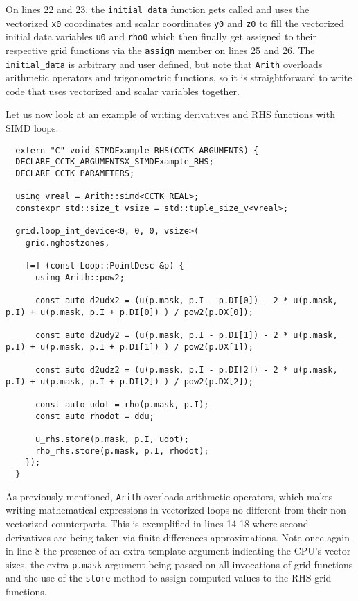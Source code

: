 On lines 22 and 23, the \texttt{initial\_data} function gets called and uses the vectorized \texttt{x0} coordinates and scalar coordinates \texttt{y0} and \texttt{z0} to fill the vectorized initial data variables \texttt{u0} and \texttt{rho0} which then finally get assigned to their respective grid functions via the \texttt{assign} member on lines 25 and 26. The \texttt{initial\_data} is arbitrary and user defined, but note that \texttt{Arith} overloads arithmetic operators and trigonometric functions, so it is straightforward to write code that uses vectorized and scalar variables together. 

Let us now look at an example of writing derivatives and RHS functions with SIMD loops.

\begin{lstlisting}
  extern "C" void SIMDExample_RHS(CCTK_ARGUMENTS) {
  DECLARE_CCTK_ARGUMENTSX_SIMDExample_RHS;
  DECLARE_CCTK_PARAMETERS;

  using vreal = Arith::simd<CCTK_REAL>;
  constexpr std::size_t vsize = std::tuple_size_v<vreal>;

  grid.loop_int_device<0, 0, 0, vsize>(
    grid.nghostzones,
    
    [=] (const Loop::PointDesc &p) {
      using Arith::pow2;

      const auto d2udx2 = (u(p.mask, p.I - p.DI[0]) - 2 * u(p.mask, p.I) + u(p.mask, p.I + p.DI[0]) ) / pow2(p.DX[0]);
      
      const auto d2udy2 = (u(p.mask, p.I - p.DI[1]) - 2 * u(p.mask, p.I) + u(p.mask, p.I + p.DI[1]) ) / pow2(p.DX[1]);
      
      const auto d2udz2 = (u(p.mask, p.I - p.DI[2]) - 2 * u(p.mask, p.I) + u(p.mask, p.I + p.DI[2]) ) / pow2(p.DX[2]);

      const auto udot = rho(p.mask, p.I);
      const auto rhodot = ddu;

      u_rhs.store(p.mask, p.I, udot);
      rho_rhs.store(p.mask, p.I, rhodot);
    });
  }
\end{lstlisting}

As previously mentioned, \texttt{Arith} overloads arithmetic operators, which makes writing mathematical expressions in vectorized loops no different from their non-vectorized counterparts. This is exemplified in lines 14-18 where second derivatives are being taken via finite differences approximations. Note once again in line 8 the presence of an extra template argument indicating the CPU's vector sizes, the extra \texttt{p.mask} argument being passed on all invocations of grid functions and the use of the \texttt{store} method to assign computed values to the RHS grid functions.

